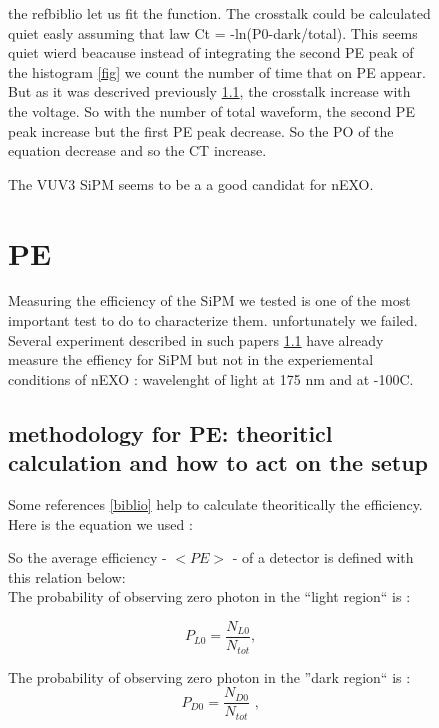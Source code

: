 \documentclass[a4paper, 11pt]{report}%
\begin{document}
\begin{figure}[!hbtp]
  
  the ref{biblio} let us fit the function. The crosstalk could be calculated quiet easly assuming that law 
  Ct = -ln(P0-dark/total). 
  This seems quiet wierd beacause instead of integrating the second PE peak of the histogram \ref{fig} 
  we count the number of time that on PE appear. 
  But as it was descrived previously \ref{}, the crosstalk increase with the voltage. 
  So with the number of total waveform, the second PE peak increase but the first PE peak decrease. So the PO of the 
  equation decrease and so the CT increase.  
  
  
  The VUV3 SiPM seems to be a a good candidat for nEXO. 
  
  \section{PE}
  
  Measuring the efficiency of the SiPM we tested is one of the most important test to do to characterize them. unfortunately we failed. 
  Several experiment described in such papers \ref{} have already measure the effiency for SiPM but not in the experiemental conditions
  of nEXO : wavelenght of light at 175 nm and at -100C. 
  
  \subsection{methodology for PE: theoriticl calculation and how to act on the setup}
  
  
  Some references \ref{biblio} help to calculate theoritically the efficiency. Here is the equation we used : 
  
  So the average efficiency - \(<PE>\) - of a detector is defined with this relation below: 
  \\
  
  The probability of observing zero photon in the ``light region`` is : 
  
  \begin{equation}
    P_{L0} = \frac{N_{L0}}{N_{tot}} \textrm{,}   
  \end{equation}
  
  The probability of observing zero photon in the ''dark region`` is : 
  \begin{equation}
    P_{D0} = \frac{N_{D0}}{N_{tot}} \textrm{ ,}
  \end{equation}
  

\end{figure}
\end{document}

